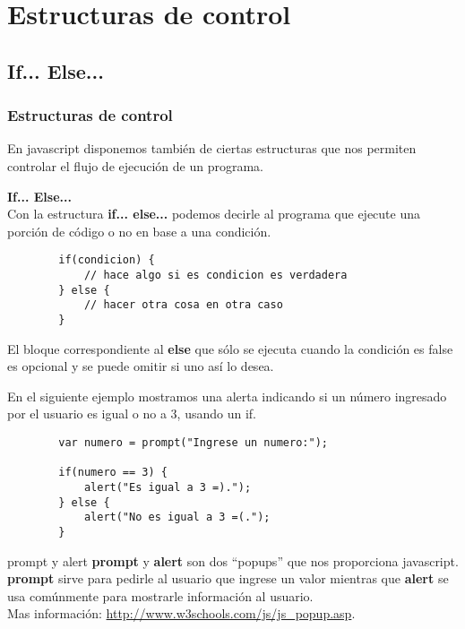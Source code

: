 \documentclass[handout, 10pt]{beamer}
\begin{document}
\section{Estructuras de control}
\subsection{If... Else...}
\begin{frame}[fragile]
	\frametitle{Estructuras de control}
	En javascript disponemos también de ciertas estructuras que nos permiten controlar el flujo de
	ejecución de un programa. \\ 
	\vspace*{10pt}
	
	\textbf{\large{If... Else...}} \\
	
	Con la estructura \textbf{if... else...} podemos decirle al programa que ejecute una porción de código
	o no en base a una condición.
	
	\begin{lstlisting}
		if(condicion) {
			// hace algo si es condicion es verdadera
		} else {
			// hacer otra cosa en otra caso
		}
	\end{lstlisting}
	
	\pause
	
	El bloque correspondiente al \textbf{else} que sólo se ejecuta cuando la condición es false es
	opcional y se puede omitir si uno así lo desea.
\end{frame}

\begin{frame}[fragile]
	\pause
	
	En el siguiente ejemplo mostramos una alerta indicando si un número ingresado por el usuario es igual
	o no a 3, usando un if.
	
	\begin{lstlisting}
		var numero = prompt("Ingrese un numero:");
		
		if(numero == 3) {
			alert("Es igual a 3 =).");
		} else {
			alert("No es igual a 3 =(.");
		}
	\end{lstlisting}
	
	\pause
	
	\begin{block}{prompt y alert}
		\textbf{prompt} y \textbf{alert} son dos ``popups'' que nos proporciona javascript. \textbf{prompt} sirve para pedirle al usuario
		que ingrese un valor mientras que \textbf{alert} se usa comúnmente para mostrarle información al usuario. \\
		
		Mas información: \url{http://www.w3schools.com/js/js_popup.asp}.
	\end{block}

\end{frame}
\end{document}
